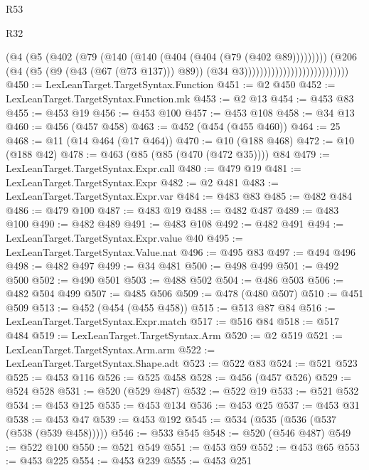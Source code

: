 \begin{lexlean}{R53}
\begin{lexlean}{R32}
\begin{coremodule}
{{{{{{{{{{{{{{{{{{{{{{{{{{{{{{{{{{{{{{{{{{{{{{{{{{{                                                  (@4
                                                    (@5
                                                      (@402
                                                        (@79
                                                          (@140
                                                            (@140
                                                              (@404 (@404 (@79 (@402 @89)))))))))
                                                    (@206
                                                      (@4
                                                        (@5 (@9 (@43 (@67 (@73 @137))) @89))
                                                        (@34 @3)))))))))))))))))))))))))))
@450 := LexLeanTarget.TargetSyntax.Function
@451 := @2 @450
@452 := LexLeanTarget.TargetSyntax.Function.mk
@453 := @2 @13
@454 := @453 @83
@455 := @453 @19
@456 := @453 @100
@457 := @453 @108
@458 := @34 @13
@460 := @456 (@457 @458)
@463 := @452 (@454 (@455 @460))
@464 := 25
@468 := @11 (@14 @464 (@17 @464))
@470 := @10 (@188 @468)
@472 := @10 (@188 @42)
@478 := @463 (@85 (@85 (@470 (@472 @35)))) @84
@479 := LexLeanTarget.TargetSyntax.Expr.call
@480 := @479 @19
@481 := LexLeanTarget.TargetSyntax.Expr
@482 := @2 @481
@483 := LexLeanTarget.TargetSyntax.Expr.var
@484 := @483 @83
@485 := @482 @484
@486 := @479 @100
@487 := @483 @19
@488 := @482 @487
@489 := @483 @100
@490 := @482 @489
@491 := @483 @108
@492 := @482 @491
@494 := LexLeanTarget.TargetSyntax.Expr.value @40
@495 := LexLeanTarget.TargetSyntax.Value.nat
@496 := @495 @83
@497 := @494 @496
@498 := @482 @497
@499 := @34 @481
@500 := @498 @499
@501 := @492 @500
@502 := @490 @501
@503 := @488 @502
@504 := @486 @503
@506 := @482 @504 @499
@507 := @485 @506
@509 := @478 (@480 @507)
@510 := @451 @509
@513 := @452 (@454 (@455 @458))
@515 := @513 @87 @84
@516 := LexLeanTarget.TargetSyntax.Expr.match
@517 := @516 @84
@518 := @517 @484
@519 := LexLeanTarget.TargetSyntax.Arm
@520 := @2 @519
@521 := LexLeanTarget.TargetSyntax.Arm.arm
@522 := LexLeanTarget.TargetSyntax.Shape.adt
@523 := @522 @83
@524 := @521 @523
@525 := @453 @116
@526 := @525 @458
@528 := @456 (@457 @526)
@529 := @524 @528
@531 := @520 (@529 @487)
@532 := @522 @19
@533 := @521 @532
@534 := @453 @125
@535 := @453 @134
@536 := @453 @25
@537 := @453 @31
@538 := @453 @47
@539 := @453 @192
@545 := @534 (@535 (@536 (@537 (@538 (@539 @458)))))
@546 := @533 @545
@548 := @520 (@546 @487)
@549 := @522 @100
@550 := @521 @549
@551 := @453 @59
@552 := @453 @65
@553 := @453 @225
@554 := @453 @239
@555 := @453 @251
}}}}}}}}}}}}}}}}}}}}}}}}}}}}}}}}}}}}}}}}}}}}}}}}}}}
\end{coremodule}
\end{lexlean}
\end{lexlean}

